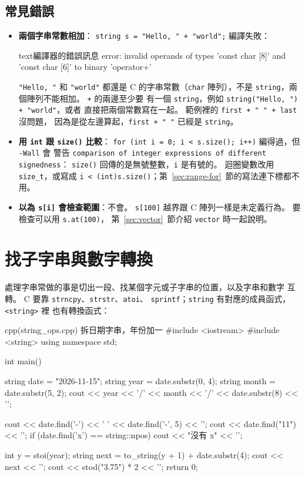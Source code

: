 \subsection{常見錯誤}

\begin{itemize}
\item \textbf{兩個字串常數相加}：
\texttt{string s = "Hello, " + "world";} 編譯失敗：
\begin{code}{text}{編譯器的錯誤訊息}
error: invalid operands of types 'const char [8]' and 'const char [6]' to binary 'operator+'
\end{code}
\texttt{"Hello, "} 和 \texttt{"world"} 都還是 C 的字串常數（\texttt{char}
陣列），不是 \texttt{string}，兩個陣列不能相加。 \texttt{+} 的兩邊至少要
有一個 \texttt{string}，例如 \texttt{string("Hello, ") + "world"}，或者
直接把兩個常數寫在一起。 範例裡的 \texttt{first + " " + last} 沒問題，
因為是從左邊算起，\texttt{first + " "} 已經是 \texttt{string}。
\item \textbf{用 \texttt{int} 跟 \texttt{size()} 比較}：
\texttt{for (int i = 0; i < s.size(); i++)} 編得過，但 \texttt{-Wall} 會
警告 \texttt{comparison of integer expressions of different signedness}：
\texttt{size()} 回傳的是無號整數，\texttt{i} 是有號的。 迴圈變數改用 \texttt{size\_t}，或寫成
\texttt{i < (int)s.size()}；第~\ref{sec:range-for}~節的寫法連下標都不用。
\item \textbf{以為 \texttt{s[i]} 會檢查範圍}：不會。 \texttt{s[100]}
越界跟 C 陣列一樣是未定義行為。 要檢查可以用 \texttt{s.at(100)}，
第~\ref{sec:vector}~節介紹 \texttt{vector} 時一起說明。
\end{itemize}

\section{找子字串與數字轉換}
\label{sec:string-ops}

處理字串常做的事是切出一段、找某個字元或子字串的位置，以及字串和數字
互轉。 C 要靠 \texttt{strncpy}、\texttt{strstr}、\texttt{atoi}、
\texttt{sprintf}；\texttt{string} 有對應的成員函式，\texttt{<string>} 裡
也有轉換函式：

\begin{example}[label=ex:string-ops]{cpp}{(string\_ops.cpp) 拆日期字串，年份加一}
#include <iostream>
#include <string>
using namespace std;

int main() {
    string date = "2026-11-15";
    string year = date.substr(0, 4);
    string month = date.substr(5, 2);
    cout << year << '/' << month << '/' << date.substr(8) << '\n';

    cout << date.find('-') << ' ' << date.find('-', 5) << '\n';
    cout << date.find("11") << '\n';
    if (date.find('x') == string::npos) {
        cout << "沒有 x" << '\n';
    }

    int y = stoi(year);
    string next = to_string(y + 1) + date.substr(4);
    cout << next << '\n';
    cout << stod("3.75") * 2 << '\n';
    return 0;
}
\end{example}

